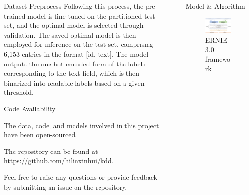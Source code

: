 \documentclass[final]{beamer}
\newlength{\sepwidth}
\newlength{\colwidth}
\newcommand{\separatorcolumn}{\begin{column}{\sepwidth}\end{column}}
\begin{document}
\begin{frame}[t]
\begin{columns}[t]
\begin{column}{\colwidth}
\begin{block}{Dataset Preprocess}
  Following this process, the pre-trained model is fine-tuned on the partitioned test set, and the optimal model is selected through validation. The saved optimal model is then employed for inference on the test set, comprising 6,153 entries in the format [id, text]. The model outputs the one-hot encoded form of the labels corresponding to the text field, which is then binarized into readable labels based on a given threshold.

    

  \end{block}

     \begin{block}{Code Availability}

   The data, code, and models involved in this project have been open-sourced. 
   
       The repository can be found at \href{https://github.com/hilinxinhui/kdd}{https://github.com/hilinxinhui/kdd}. 
   
   Feel free to raise any questions or provide feedback by submitting an issue on the repository.


  \end{block}

\end{column}

\separatorcolumn

\begin{column}{\colwidth}

  

  \begin{block}{Model \& Algorithm}

    \begin{figure}
        \centering
        \includegraphics[width=1\textwidth]{logos/ernie-framework.png}
        \caption{ERNIE 3.0 framework}
        \label{fig: ERNIE 3.0 framework}
    \end{figure}


\end{block}
\end{column}
\end{columns}
\end{frame}
\end{document}
